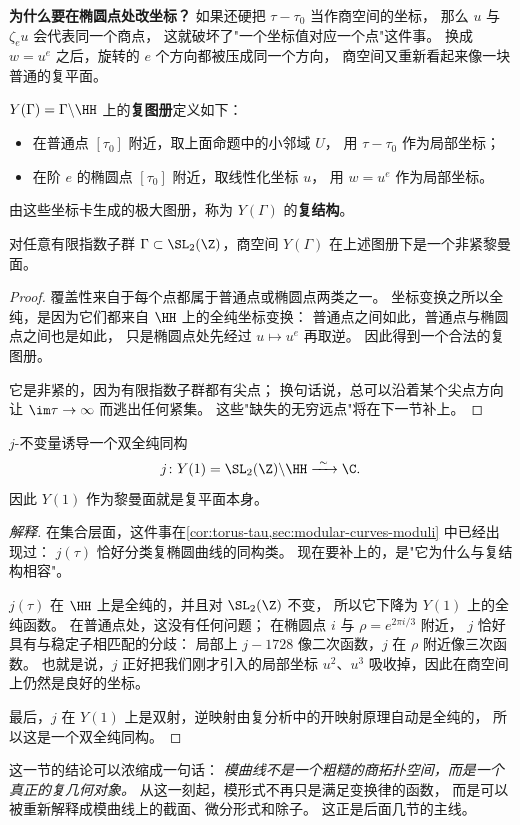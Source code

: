 

\textbf{为什么要在椭圆点处改坐标？}
如果还硬把 $\tau-\tau_0$ 当作商空间的坐标，
那么 $u$ 与 $\zeta_eu$ 会代表同一个商点，
这就破坏了"一个坐标值对应一个点"这件事。
换成 $w=u^e$ 之后，旋转的 $e$ 个方向都被压成同一个方向，
商空间又重新看起来像一块普通的复平面。

\begin{definition}
\label{def:y-gamma-atlas}
$Y(\Gamma)=\Gamma\backslash\HH$ 上的\textbf{复图册}定义如下：
\begin{itemize}
  \item 在普通点 $[\tau_0]$ 附近，取上面命题中的小邻域 $U$，
    用 $\tau-\tau_0$ 作为局部坐标；
  \item 在阶 $e$ 的椭圆点 $[\tau_0]$ 附近，取线性化坐标 $u$，
    用 $w=u^e$ 作为局部坐标。
\end{itemize}
由这些坐标卡生成的极大图册，称为 $Y(\Gamma)$ 的\textbf{复结构}。
\end{definition}

\begin{proposition}
\label{prop:y-gamma-riemann-surface}
对任意有限指数子群 $\Gamma\subset\SL_2(\Z)$，商空间 $Y(\Gamma)$ 在上述图册下是一个非紧黎曼面。
\end{proposition}

\begin{proof}
覆盖性来自于每个点都属于普通点或椭圆点两类之一。
坐标变换之所以全纯，是因为它们都来自 $\HH$ 上的全纯坐标变换：
普通点之间如此，普通点与椭圆点之间也是如此，
只是椭圆点处先经过 $u\mapsto u^e$ 再取逆。
因此得到一个合法的复图册。

它是非紧的，因为有限指数子群都有尖点；
换句话说，总可以沿着某个尖点方向让 $\im\tau\to\infty$ 而逃出任何紧集。
这些"缺失的无穷远点"将在下一节补上。
\end{proof}

\begin{theorem}
\label{thm:y1-is-C-riemann}
$j$-不变量诱导一个双全纯同构
\[
  j\colon Y(1)=\SL_2(\Z)\backslash\HH \xrightarrow{\ \sim\ } \C.
\]
因此 $Y(1)$ 作为黎曼面就是复平面本身。
\end{theorem}

\begin{proof}[解释]
在集合层面，这件事在\cref{cor:torus-tau,sec:modular-curves-moduli} 中已经出现过：
$j(\tau)$ 恰好分类复椭圆曲线的同构类。
现在要补上的，是"它为什么与复结构相容"。

$j(\tau)$ 在 $\HH$ 上是全纯的，并且对 $\SL_2(\Z)$ 不变，
所以它下降为 $Y(1)$ 上的全纯函数。
在普通点处，这没有任何问题；
在椭圆点 $i$ 与 $\rho=e^{2\pi i/3}$ 附近，
$j$ 恰好具有与稳定子相匹配的分歧：
局部上 $j-1728$ 像二次函数，$j$ 在 $\rho$ 附近像三次函数。
也就是说，$j$ 正好把我们刚才引入的局部坐标
$u^2$、$u^3$ 吸收掉，因此在商空间上仍然是良好的坐标。

最后，$j$ 在 $Y(1)$ 上是双射，逆映射由复分析中的开映射原理自动是全纯的，
所以这是一个双全纯同构。
\end{proof}

\begin{remark}
这一节的结论可以浓缩成一句话：
\emph{模曲线不是一个粗糙的商拓扑空间，而是一个真正的复几何对象。}
从这一刻起，模形式不再只是满足变换律的函数，
而是可以被重新解释成模曲线上的截面、微分形式和除子。
这正是后面几节的主线。
\end{remark}
